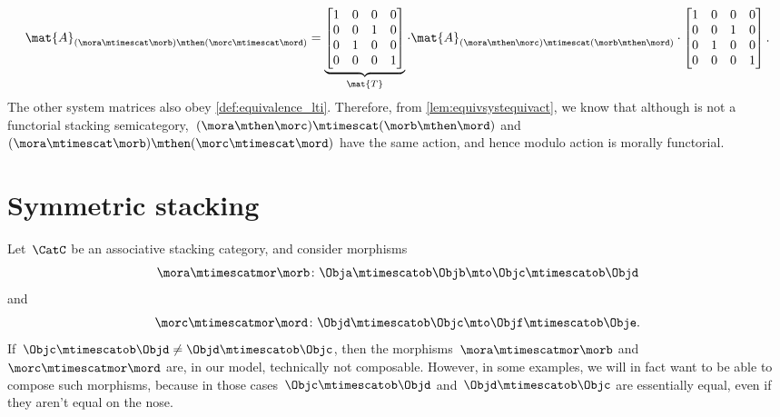 \begin{example}
    \begin{equation*}
        \mat{A}_{(\mora\mtimescat \morb)\mthen (\morc\mtimescat \mord)}=
        \underbrace{\begin{bmatrix}
                1 & 0 & 0 & 0 \\
                0 & 0 & 1 & 0 \\
                0 & 1 & 0 & 0 \\
                0 & 0 & 0 & 1
            \end{bmatrix}}_{\mat{T}}\cdot
        \mat{A}_{(\mora \mthen \morc)\mtimescat (\morb\mthen \mord)}
        \cdot
        \begin{bmatrix}
            1 & 0 & 0 & 0 \\
            0 & 0 & 1 & 0 \\
            0 & 1 & 0 & 0 \\
            0 & 0 & 0 & 1
        \end{bmatrix}.
    \end{equation*}
    The other system matrices also obey \cref{def:equivalence_lti}.
    Therefore, from \cref{lem:equivsystequivact}, we know that although \LTI is not a functorial stacking semicategory,~$(\mora \mthen \morc)\mtimescat (\morb\mthen \mord)$ and~$(\mora\mtimescat \morb)\mthen (\morc\mtimescat \mord)$ have the same action, and hence \LTI modulo action is morally functorial.
\end{example}

\section{Symmetric stacking}

Let~$\CatC$ be an associative stacking category, and consider morphisms
\begin{equation*}
    \mora \mtimescatmor \morb \colon \Obja \mtimescatob \Objb \mto \Objc \mtimescatob \Objd
\end{equation*}
and~
\begin{equation*}
    \morc \mtimescatmor \mord \colon \Objd \mtimescatob \Objc \mto \Objf \mtimescatob \Obje.
\end{equation*}
If~$\Objc \mtimescatob \Objd \neq \Objd \mtimescatob \Objc$, then the morphisms~$\mora \mtimescatmor \morb$ and~$\morc \mtimescatmor \mord$ are, in our model, technically not composable.
However, in some examples, we will in fact want to be able to compose such morphisms, because in those cases~$\Objc \mtimescatob \Objd$ and~$\Objd \mtimescatob \Objc$ are essentially equal, even if they aren't equal on the nose.


